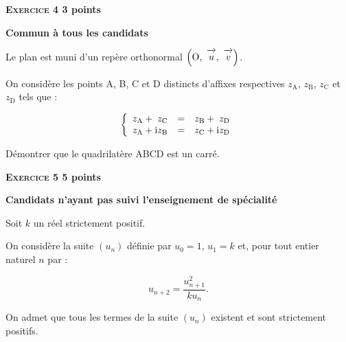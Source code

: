 \documentclass[10pt,a4paper]{article}
\newcommand{\vect}[1]{\overrightarrow{\,\mathstrut#1\,}}
\def\Ouv{$\left(\text{O},~\vect{u},~\vect{v}\right)$}
\begin{document}
\vspace{0,5cm}

\textbf{\textsc{Exercice 4} \hfill 3 points}

\textbf{Commun à tous les candidats}

\medskip

Le plan est muni d'un repère orthonormal \Ouv.

On considère les points A, B, C et D distincts d'affixes respectives $z_{\text{A}}$,  $z_{\text{B}}$,  $z_{\text{C}}$ et $z_{\text{D}}$ tels que :

\[\left\{
\begin{array}{l c r}
z_{\text{A}} + \phantom{\text{i}}z_{\text{C}} 		&=& z_{\text{B}} + \phantom{\text{i}}z_{\text{D}}\\
z_{\text{A}} + \text{i} z_{\text{B}}&=& z_{\text{C}} + \text{i} z_{\text{D}}
\end{array}\right.\]

Démontrer que le quadrilatère ABCD est un carré.

\vspace{0,5cm}

\textbf{\textsc{Exercice 5} \hfill 5 points}

\textbf{Candidats n'ayant pas suivi l'enseignement de spécialité}

\medskip

Soit $k$ un réel strictement positif.

On considère la suite $\left(u_n\right)$ définie par $u_0 = 1$,\: $u_1 = k$ et, pour tout entier naturel $n$ par :

\[u_{n+2} = \dfrac{u^2_{n+1}}{k u_n}.\]

\smallskip

On admet que tous les termes de la suite $\left(u_n\right)$ existent et sont strictement positifs.

\medskip
\end{document}

